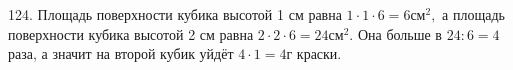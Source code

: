 124. Площадь поверхности кубика высотой 1 см равна $1\cdot1\cdot6=6\text{см}^2,$ а площадь поверхности кубика высотой 2 см равна $2\cdot2\cdot6=24\text{см}^2.$ Она больше в $24:6=4$ раза, а значит на второй кубик уйдёт $4\cdot1=4$г краски.\\
